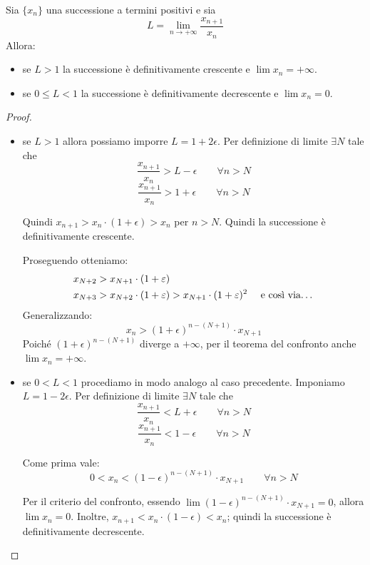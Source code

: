 \begin{theorem}
Sia $\{x_n\}$ una successione a termini positivi e sia 
\begin{equation*}
L = \lim_{n \to +\infty} \frac{x_{n+1}}{x_n}
\end{equation*}
Allora:
\begin{itemize}
\item se $L > 1$ la successione è definitivamente crescente e $\lim x_n = +\infty$.
\item se $0 \le L < 1$ la successione è definitivamente decrescente e $\lim x_n = 0$.
\end{itemize}
\end{theorem}

\begin{proof} \hfill
\begin{itemize}
\item se $L > 1$ allora possiamo imporre $L = 1 + 2\epsilon$. Per definizione di limite $\exists N$ tale che 
\begin{equation*}
\frac{x_{n+1}}{x_n} > L - \epsilon \qquad \forall n > N
\end{equation*}
\begin{equation*}
\frac{x_{n+1}}{x_n} > 1 + \epsilon \qquad \forall n > N
\end{equation*}

Quindi $x_{n+1} > x_n \cdot (1+\epsilon) > x_n$ per $n > N$. Quindi la successione è definitivamente crescente.

Proseguendo otteniamo:
\begin{align*}
x_{N+2} &> x_{N+1} \cdot (1+\epsilon) \\
x_{N+3} &> x_{N+2} \cdot (1+\epsilon) > x_{N+1} \cdot (1+\epsilon)^2 \quad \text { e così via\dots}
\end{align*}
Generalizzando:
\begin{equation*}
x_n > (1+\epsilon)^{n-(N+1)} \cdot x_{N+1}
\end{equation*}
Poiché $(1+\epsilon)^{n-(N+1)}$ diverge a $+\infty$, per il teorema del confronto anche $\lim x_n = +\infty$.

\item se $0 < L < 1$ procediamo in modo analogo al caso precedente. Imponiamo $L = 1 - 2\epsilon$. Per definizione di limite $\exists N$ tale che
\begin{equation*}
\frac{x_{n+1}}{x_n} < L + \epsilon \qquad \forall n > N
\end{equation*}
\begin{equation*}
\frac{x_{n+1}}{x_n} < 1 - \epsilon \qquad \forall n > N
\end{equation*}

Come prima vale:
\begin{equation*}
0 < x_n < (1-\epsilon)^{n-(N+1)} \cdot x_{N+1} \qquad \forall n>N
\end{equation*}

Per il criterio del confronto, essendo $\lim (1-\epsilon)^{n-(N+1)} \cdot x_{N+1} = 0$, allora $\lim x_n = 0$. Inoltre, $x_{n+1} < x_n \cdot (1 - \epsilon) < x_n$; quindi la successione è definitivamente decrescente.
\end{itemize}
\end{proof}